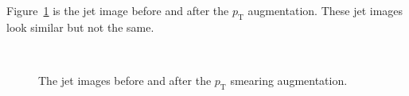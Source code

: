 \documentclass[12pt]{article}
\begin{document}
		Figure~\ref{fig:pt_smearing_jet_constituent_jet_image} is the jet image before and after the $p_{\text{T}}$ augmentation. These jet images look similar but not the same.
		\begin{figure}[htpb]
			\centering
			 \\
			\caption{The jet images before and after the $p_{\text{T}}$ smearing augmentation.}
			\label{fig:pt_smearing_jet_constituent_jet_image}
		\end{figure}
\end{document}
